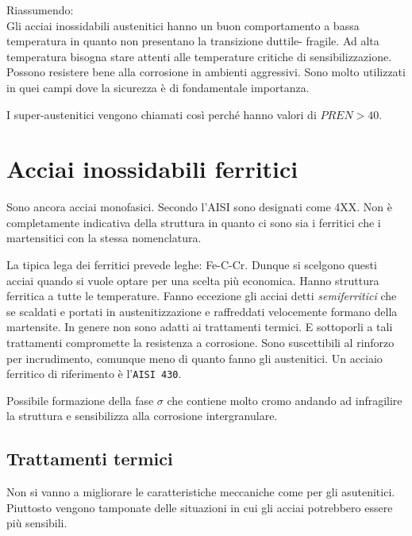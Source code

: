 Riassumendo:\\
Gli acciai inossidabili austenitici hanno un buon comportamento a bassa 
temperatura in quanto non presentano la transizione duttile-
fragile. Ad alta temperatura bisogna stare attenti alle temperature  
critiche di sensibilizzazione.
Possono resistere bene alla corrosione in ambienti aggressivi.
Sono molto utilizzati in quei campi dove la sicurezza è di 
fondamentale importanza.

I super-austenitici vengono chiamati così perché hanno valori di $PREN>40$.


\section{Acciai inossidabili ferritici}
Sono ancora acciai monofasici. Secondo l'\ac{AISI} sono 
designati come 4XX. Non è completamente indicativa della struttura in
quanto ci sono sia i ferritici che i martensitici con la stessa nomenclatura.

La tipica lega dei ferritici prevede leghe: Fe-C-Cr.
Dunque si scelgono questi acciai quando si vuole optare per una scelta più 
economica.
Hanno struttura ferritica a tutte le temperature. Fanno eccezione gli acciai
detti \emph{semiferritici} che se scaldati e portati in austenitizzazione 
e raffreddati velocemente formano della martensite.
In genere non sono adatti ai trattamenti termici. E sottoporli a tali 
trattamenti compromette la resistenza a corrosione.
Sono suscettibili al rinforzo per incrudimento, comunque meno di quanto fanno 
gli austenitici.
Un acciaio ferritico di riferimento è l'\texttt{\ac{AISI} 430}.


Possibile formazione della fase $\sigma$ che contiene molto cromo 
andando ad infragilire la struttura e sensibilizza alla corrosione 
intergranulare.

\subsection{Trattamenti termici}
Non si vanno a migliorare le caratteristiche meccaniche come per gli 
asutenitici. Piuttosto vengono tamponate delle situazioni in cui gli 
acciai potrebbero essere più sensibili.

